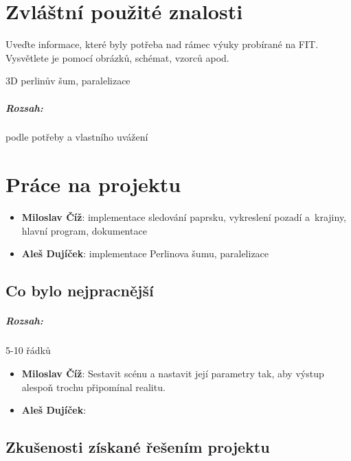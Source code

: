 \documentclass[12pt,a4paper,titlepage,final]{report}
\newcommand\AuthorA{Miloslav Číž}
\newcommand\AuthorB{Aleš Dujíček}
\begin{document}
\chapter{Zvláštní použité znalosti}

Uveďte informace, které byly potřeba nad rámec výuky probírané na FIT.
Vysvětlete je pomocí obrázků, schémat, vzorců apod.

3D perlinův šum, paralelizace

\paragraph{Rozsah:} podle potřeby a vlastního uvážení


\chapter{Práce na projektu}

\begin{itemize}
\item \textbf{\AuthorA}: implementace sledování paprsku, vykreslení pozadí a~krajiny, hlavní program, dokumentace
\item \textbf{\AuthorB}: implementace Perlinova šumu, paralelizace
\end{itemize}

\section{Co bylo nejpracnější}

\paragraph{Rozsah:} 5-10 řádků

\begin{itemize}
\item \textbf{\AuthorA}: Sestavit scénu a nastavit její parametry tak,
aby výstup alespoň trochu připomínal realitu.
\item \textbf{\AuthorB}:
\end{itemize}

\section{Zkušenosti získané řešením projektu}
\end{document}
